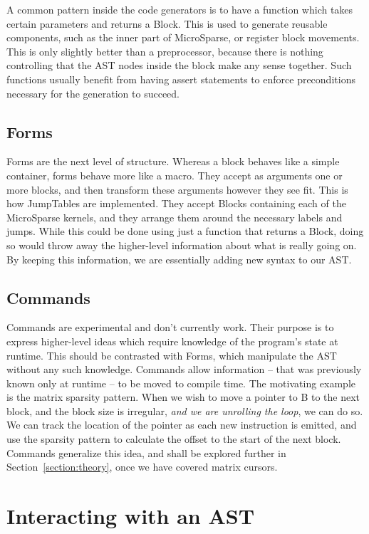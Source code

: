 A common pattern inside the code generators is to have a function which takes certain parameters and returns a Block. This is used to generate reusable components, such as the inner part of MicroSparse, or register block movements. This is only slightly better than a preprocessor, because there is nothing controlling that the AST nodes inside the block make any sense together. Such functions usually benefit from having assert statements to enforce preconditions necessary for the generation to succeed.

\subsection{Forms}

Forms are the next level of structure. Whereas a block behaves like a simple container, forms behave more like a macro. They accept as arguments one or more blocks, and then transform these arguments however they see fit. This is how JumpTables are implemented. They accept Blocks containing each of the MicroSparse kernels, and they arrange them around the necessary labels and jumps. While this could be done using just a function that returns a Block, doing so would throw away the higher-level information about what is really going on. By keeping this information, we are essentially adding new syntax to our AST.

\subsection{Commands}

Commands are experimental and don't currently work. Their purpose is to express higher-level ideas which require knowledge of the program's state at runtime. This should be contrasted with Forms, which manipulate the AST without any such knowledge. Commands allow information -- that was previously known only at runtime -- to be moved to compile time. The motivating example is the matrix sparsity pattern. When we wish to move a pointer to B to the next block, and the block size is irregular, \emph{and we are unrolling the loop}, we can do so. We can track the location of the pointer as each new instruction is emitted, and use the sparsity pattern to calculate the offset to the start of the next block. Commands generalize this idea, and shall be explored further in Section~\ref{section:theory}, once we have covered matrix cursors. 

\section{Interacting with an AST}

